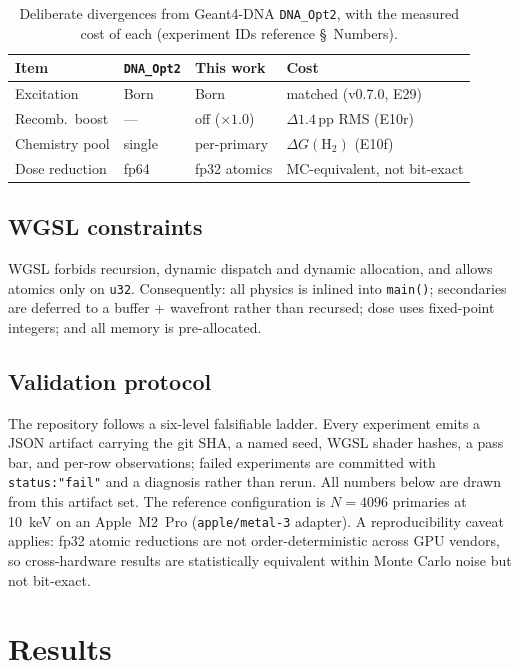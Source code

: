 \documentclass[11pt]{article}
\begin{document}
\begin{table}[t]\centering\footnotesize
\caption{Deliberate divergences from Geant4-DNA \texttt{DNA\_Opt2}, with the
measured cost of each (experiment IDs reference \S~Numbers).}
\label{tab:diverge}
\begin{tabular}{@{}llll@{}}
\toprule
Item & \texttt{DNA\_Opt2} & This work & Cost \\
\midrule
Excitation & Born & Born & matched (v0.7.0, E29) \\
Recomb.\ boost & --- & off ($\times 1.0$) & $\Delta 1.4$\,pp RMS (E10r) \\
Chemistry pool & single & per-primary & $\Delta G(\mathrm{H_2})$ (E10f) \\
Dose reduction & fp64 & fp32 atomics & MC-equivalent, not bit-exact \\
\bottomrule
\end{tabular}
\end{table}

\subsection{WGSL constraints}
WGSL forbids recursion, dynamic dispatch and dynamic allocation, and allows
atomics only on \texttt{u32}. Consequently: all physics is inlined into
\texttt{main()}; secondaries are deferred to a buffer + wavefront rather than
recursed; dose uses fixed-point integers; and all memory is pre-allocated.

\subsection{Validation protocol}
The repository follows a six-level falsifiable ladder. Every experiment emits
a JSON artifact carrying the git SHA, a named seed, WGSL shader hashes, a pass
bar, and per-row observations; failed experiments are committed with
\texttt{status:"fail"} and a diagnosis rather than rerun. All numbers below
are drawn from this artifact set. The reference configuration is $N=4096$
primaries at \SI{10}{keV} on an Apple~M2~Pro (\texttt{apple/metal-3} adapter).
A reproducibility caveat applies: fp32 atomic reductions are not
order-deterministic across GPU vendors, so cross-hardware results are
statistically equivalent within Monte Carlo noise but not bit-exact.

\section{Results}
\label{sec:results}
\end{document}
